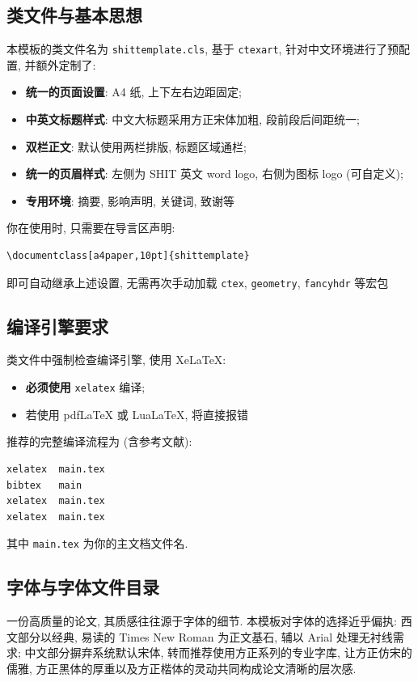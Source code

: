 \documentclass[a4paper,10pt]{shittemplate}
\begin{document}
\subsection{类文件与基本思想}
本模板的类文件名为 \verb|shittemplate.cls|, 基于 \verb|ctexart|, 
针对中文环境进行了预配置, 并额外定制了: 
\begin{itemize}
  \item \textbf{统一的页面设置}: A4 纸, 上下左右边距固定; 
  \item \textbf{中英文标题样式}: 中文大标题采用方正宋体加粗, 段前段后间距统一; 
  \item \textbf{双栏正文}: 默认使用两栏排版, 标题区域通栏; 
  \item \textbf{统一的页眉样式}: 左侧为 SHIT 英文 word logo, 右侧为图标 logo (可自定义); 
  \item \textbf{专用环境}: 摘要, 影响声明, 关键词, 致谢等
\end{itemize}
你在使用时, 只需要在导言区声明: 
\begin{verbatim}
\documentclass[a4paper,10pt]{shittemplate}
\end{verbatim}
即可自动继承上述设置, 无需再次手动加载 \verb|ctex|, \verb|geometry|, 
\verb|fancyhdr| 等宏包
\subsection{编译引擎要求}
类文件中强制检查编译引擎, 使用 XeLaTeX: 
\begin{itemize}
  \item \textbf{必须使用} \verb|xelatex| 编译;
  \item 若使用 pdfLaTeX 或 LuaLaTeX, 将直接报错
\end{itemize}
推荐的完整编译流程为 (含参考文献): 
\begin{verbatim}
xelatex  main.tex
bibtex   main
xelatex  main.tex
xelatex  main.tex
\end{verbatim}
其中 \verb|main.tex| 为你的主文档文件名. 
\subsection{字体与字体文件目录}
一份高质量的论文, 其质感往往源于字体的细节. 
本模板对字体的选择近乎偏执: 西文部分以经典, 易读的 Times New Roman 为正文基石, 
辅以 Arial 处理无衬线需求; 中文部分摒弃系统默认宋体, 转而推荐使用方正系列的专业字库, 
让方正仿宋的儒雅, 方正黑体的厚重以及方正楷体的灵动共同构成论文清晰的层次感. 
\end{document}
